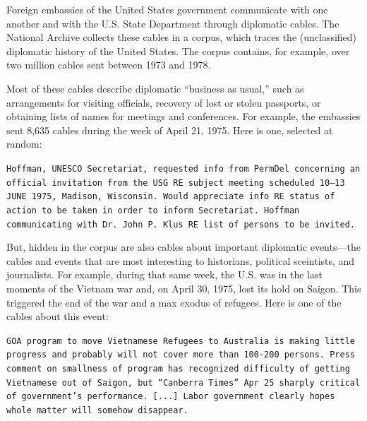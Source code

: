 
Foreign embassies of the United States government communicate with one
another and with the U.S. State Department through diplomatic cables.
The National Archive collects these cables in a corpus, which traces
the (unclassified) diplomatic history of the United States. The corpus
contains, for example, over two million cables sent between 1973 and
1978.

Most of these cables describe diplomatic ``business as usual,'' such
as arrangements for visiting officials, recovery of lost or stolen
passports, or obtaining lists of names for meetings and
conferences. For example, the embassies sent 8,635 cables during the
week of April 21, 1975. Here is one, selected at random:
\begin{shaded*} \tt{Hoffman, UNESCO Secretariat, requested info from
PermDel concerning an official invitation from the USG
RE subject meeting scheduled 10--13 JUNE 1975, Madison,
Wisconsin.  Would appreciate info RE status of action to
be taken in order to inform Secretariat.  Hoffman communicating
with Dr.~John P.~Klus RE list of persons to be invited.}
\end{shaded*}

But, hidden in the corpus are also cables about important diplomatic
events---the cables and events that are most interesting to
historians, political sceintists, and journalists. For example, during
that same week, the U.S. was in the last moments of the Vietnam war
and, on April 30, 1975, lost its hold on Saigon. This triggered the
end of the war and a max exodus of refugees. Here is one of the cables
about this event:
\begin{shaded*}
  \tt{GOA program to move Vietnamese Refugees to Australia
  is making little progress and probably will not cover more than
  100-200 persons.  Press comment on smallness of program has
  recognized difficulty of getting Vietnamese out of Saigon, but
  ``Canberra Times'' Apr 25 sharply critical of government's
  performance.  [...]
  Labor government clearly hopes whole
  matter will somehow disappear.}
\end{shaded*}

